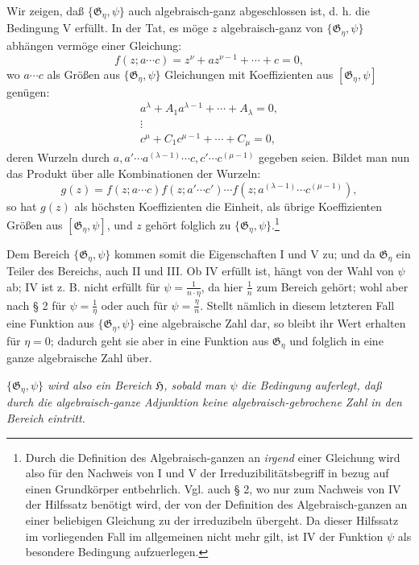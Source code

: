 \documentclass[11pt]{article}
\begin{document}
Wir zeigen, daß $\{\mathfrak G_\eta,\psi\}$ auch algebraisch-ganz abgeschlossen
ist, d. h. die Bedingung V erfüllt. In der Tat, es möge $z$ algebraisch-ganz von
$\{\mathfrak G_\eta,\psi\}$ abhängen vermöge einer Gleichung:
\[
 f(z;a\cdots c)=z^\nu+a z^{\nu-1}+\cdots+c=0,
\]
wo $a\cdots c$ als Größen aus $\{\mathfrak G_\eta,\psi\}$ Gleichungen mit
Koeffizienten aus $[\mathfrak G_\eta,\psi]$ genügen:
\[
\begin{gathered}
 a^\lambda+A_1a^{\lambda-1}+\cdots+A_\lambda=0,\\
 \vdots\\
 c^\mu+C_1c^{\mu-1}+\cdots+C_\mu=0,
\end{gathered}
\]
deren Wurzeln durch $a,a'\cdots a^{(\lambda-1)}\cdots c,c'\cdots c^{(\mu-1)}$
gegeben seien. Bildet man nun das Produkt über alle Kombinationen der Wurzeln:
\[
 g(z)=f(z;a\cdots c)f(z;a'\cdots c')\cdots
      f(z;a^{(\lambda-1)}\cdots c^{(\mu-1)}),
\]
so hat $g(z)$ als höchsten Koeffizienten die Einheit, als übrige Koeffizienten
Größen aus $[\mathfrak G_\eta,\psi]$, und $z$ gehört folglich zu
$\{\mathfrak G_\eta,\psi\}$.\footnote{Durch die Definition des
Algebraisch-ganzen an \emph{irgend} einer Gleichung wird also für den Nachweis
von I und V der Irreduzibilitätsbegriff in bezug auf einen Grundkörper
entbehrlich. Vgl. auch § 2, wo nur zum Nachweis von IV der Hilfssatz benötigt
wird, der von der Definition des Algebraisch-ganzen an einer beliebigen Gleichung
zu der irreduzibeln übergeht. Da dieser Hilfssatz im vorliegenden Fall im
allgemeinen nicht mehr gilt, ist IV der Funktion $\psi$ als besondere Bedingung
aufzuerlegen.}

Dem Bereich $\{\mathfrak G_\eta,\psi\}$ kommen somit die Eigenschaften I und V
zu; und da $\mathfrak G_\eta$ ein Teiler des Bereichs, auch II und III. Ob IV
erfüllt ist, hängt von der Wahl von $\psi$ ab; IV ist z. B. nicht erfüllt für
$\psi=\frac{1}{n\cdot\eta}$, da hier $\frac1n$ zum Bereich gehört; wohl aber
nach § 2 für $\psi=\frac1\eta$ oder auch für $\psi=\frac{\eta}{n}$. Stellt
nämlich in diesem letzteren Fall eine Funktion aus $\{\mathfrak G_\eta,\psi\}$
eine algebraische Zahl dar, so bleibt ihr Wert erhalten für $\eta=0$; dadurch
geht sie aber in eine Funktion aus $\mathfrak G_\eta$ und folglich in eine ganze
algebraische Zahl über.

\emph{$\{\mathfrak G_\eta,\psi\}$ wird also ein Bereich $\mathfrak H$, sobald
man $\psi$ die Bedingung auferlegt, daß durch die algebraisch-ganze Adjunktion
keine algebraisch-gebrochene Zahl in den Bereich eintritt.}
\end{document}
